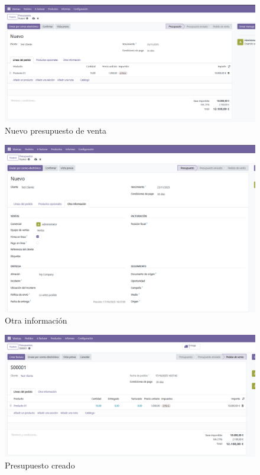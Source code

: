 \documentclass[a4paper,12pt]{article}
\begin{document}
\begin{figure}[h!]
    \centering
    \includegraphics[width=1\textwidth]{pr2odoo41-nuevoPresupuesto.png}
    \caption{Nuevo presupuesto de venta}
\end{figure}
\FloatBarrier

\begin{figure}[h!]
    \centering
    \includegraphics[width=1\textwidth]{pr2odoo42-otraInfo.png}
    \caption{Otra información}
\end{figure}
\FloatBarrier

\begin{figure}[h!]
    \centering
    \includegraphics[width=1\textwidth]{pr2odoo43-presupuestoCreado.png}
    \caption{Presupuesto creado}
\end{figure}
\FloatBarrier
\end{document}
